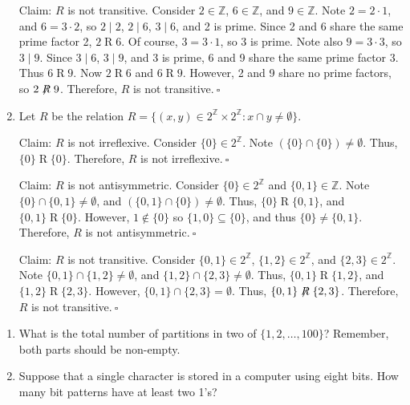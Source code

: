 \documentclass{article}
\newcommand{\Z}{\mathbb{Z}}
\theoremstyle{definition}
\begin{document}
\begin{solution}
\begin{enumerate}
Claim: $R$ is not transitive. Consider $2\in\Z$, $6\in\Z$, and $9\in\Z$. Note $2=2\cdot 1$, and $6=3\cdot 2$, so $2\mid 2$, $2\mid 6$, $3\mid 6$, and 2 is prime. Since 2 and 6 share the same prime factor 2, $2\mathrel{R}6$. Of course, $3=3\cdot 1$, so 3 is prime. Note also $9=3\cdot 3$, so $3\mid 9$. Since $3\mid 6$, $3\mid 9$, and 3 is prime, 6 and 9 share the same prime factor 3. Thus $6\mathrel{R}9$. Now $2\mathrel{R}6$ and $6\mathrel{R}9$. However, 2 and 9 share no prime factors, so $2\not\mathrel{R}9$. Therefore, $R$ is not transitive.$~\square$
\item Let $R$ be the relation $R=\{(x,y)\in 2^\Z\times 2^\Z:x\cap y\neq\emptyset\}$.

Claim: $R$ is not irreflexive. Consider $\{0\}\in 2^\Z$. Note $(\{0\}\cap\{0\})\neq\emptyset$. Thus, $\{0\}\mathrel{R}\{0\}$. Therefore, $R$ is not irreflexive.$~\square$

Claim: $R$ is not antisymmetric. Consider $\{0\}\in 2^\Z$ and $\{0,1\}\in\Z$. Note $\{0\}\cap\{0,1\}\neq\emptyset$, and $(\{0,1\}\cap\{0\})\neq\emptyset$. Thus, $\{0\}\mathrel{R}\{0,1\}$, and $\{0,1\}\mathrel{R}\{0\}$. However, $1\notin\{0\}$ so $\{1,0\}\subseteq\{0\}$, and thus $\{0\}\neq\{0,1\}$. Therefore, $R$ is not antisymmetric.$~\square$

Claim: $R$ is not transitive. Consider $\{0,1\}\in 2^\Z$, $\{1,2\}\in 2^\Z$, and $\{2,3\}\in 2^\Z$. Note $\{0,1\}\cap\{1,2\}\neq\emptyset$, and $\{1,2\}\cap\{2,3\}\neq\emptyset$. Thus, $\{0,1\}\mathrel{R}\{1,2\}$, and $\{1,2\}\mathrel{R}\{2,3\}$. However, $\{0,1\}\cap\{2,3\}=\emptyset$. Thus, $\{0,1\}\not\mathrel{R}\{2,3\}$. Therefore, $R$ is not transitive.$~\square$
\end{enumerate}
\end{solution}
\begin{question}
    \begin{enumerate}
   	\item What is the total number of partitions in two of $\{1, 2, \dots, 100 \}$? 
	Remember, both parts should be non-empty.
        \item Suppose that a single character is stored in a computer using eight bits. 
        How many bit patterns have at least two 1's?
   	\end{enumerate}
\end{question}
\end{document}
